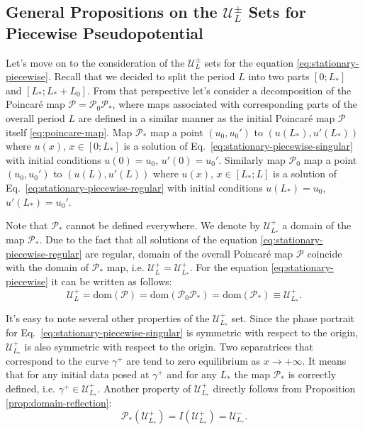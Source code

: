 \subsection{General Propositions on the $\mathscr{U}_L^{\pm}$ Sets for Piecewise Pseudopotential}

Let's move on to the consideration of the $\mathscr{U}_L^{\pm}$ sets for the equation \eqref{eq:stationary-piecewise}.
Recall that we decided to split the period $L$ into two parts $[0; L_*]$ and $[L_*; L_* + L_0]$.
From that perspective let's consider a decomposition of the Poincar\'e map $\mathcal{P} = \mathcal{P}_0 \mathcal{P}_*$, where  maps associated with corresponding parts of the overall period $L$ are defined in a similar manner as the initial Poincar\'e map $\mathcal{P}$ itself \eqref{eq:poincare-map}.
Map $\mathcal{P}_*$ map a point $(u_0, u_0')$ to $(u(L_*), u'(L_*))$ where $u(x), \, x \in [0; L_*]$ is a solution of Eq.~\eqref{eq:stationary-piecewise-singular} with initial conditions $u(0) = u_0$, $u'(0) = u_0'$.
Similarly map $\mathcal{P}_0$ map a point $(u_0, u_0')$ to $(u(L), u'(L))$ where $u(x), \, x \in [L_*; L]$ is a solution of Eq.~\eqref{eq:stationary-piecewise-regular} with initial conditions $u(L_*) = u_0$, $u'(L_*) = u_0'$.

Note that $\mathcal{P}_*$ cannot be defined everywhere.
We denote by $\mathscr{U}_{L_*}^+$ a domain of the map $\mathcal{P}_*$.
Due to the fact that all solutions of the equation \eqref{eq:stationary-piecewise-regular} are regular, domain of the overall Poincar\'e map $\mathcal{P}$ coincide with the domain of $\mathcal{P}_*$ map, i.e. $\mathscr{U}_L^+ = \mathscr{U}_{L_*}^+$.
For the equation \eqref{eq:stationary-piecewise} it can be written as follows:
\begin{equation}
	\mathscr{U}_L^+ = \textrm{dom}(\mathcal{P}) = \textrm{dom}(\mathcal{P}_0 \mathcal{P}_*) = \textrm{dom}(\mathcal{P}_*) \equiv \mathscr{U}_{L_*}^+.
\end{equation}

It's easy to note several other properties of the $\mathscr{U}_{L_*}^+$ set.
Since the phase portrait for Eq.~\eqref{eq:stationary-piecewise-singular} is symmetric with respect to the origin, $\mathscr{U}_{L_*}^+$ is also symmetric with respect to the origin.
Two separatrices that correspond to the curve $\gamma^+$ are tend to zero equilibrium as $x \to +\infty$.
It means that for any initial data posed at $\gamma^+$ and for any $L_*$ the map $\mathcal{P}_*$ is correctly defined, i.e. $\gamma^+ \in \mathscr{U}_{L_*}^+$.
Another property of $\mathscr{U}_{L_*}^+$ directly follows from Proposition \ref{prop:domain-reflection}:
\begin{equation}
	\mathcal{P}_*(\mathscr{U}_{L_*}^+) = I (\mathscr{U}_{L_*}^+) = \mathscr{U}_{L_*}^-.
\label{eq:domain-reflection-singular-forward}
\end{equation}

